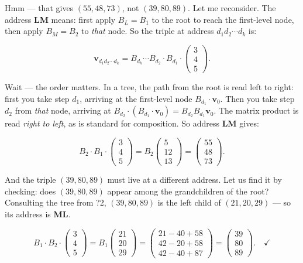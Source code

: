 Hmm --- that gives $(55, 48, 73)$, not $(39, 80, 89)$. Let me reconsider. The address \textbf{LM} means: first apply $B_L = B_1$ to the root to reach the first-level node, then apply $B_M = B_2$ to \textit{that} node. So the triple at address $d_1 d_2 \cdots d_k$ is:

\[
\mathbf{v}_{d_1 d_2 \cdots d_k} = B_{d_k} \cdots B_{d_2} \cdot B_{d_1} \cdot \begin{pmatrix} 3 \\ 4 \\ 5 \end{pmatrix}.
\]

Wait --- the order matters. In a tree, the path from the root is read left to right: first you take step $d_1$, arriving at the first-level node $B_{d_1} \cdot \mathbf{v}_0$. Then you take step $d_2$ from \textit{that} node, arriving at $B_{d_2} \cdot (B_{d_1} \cdot \mathbf{v}_0) = B_{d_2} B_{d_1} \mathbf{v}_0$. The matrix product is read \textit{right to left}, as is standard for composition. So address \textbf{LM} gives:

\[
B_2 \cdot B_1 \cdot \begin{pmatrix} 3 \\ 4 \\ 5 \end{pmatrix} = B_2 \begin{pmatrix} 5 \\ 12 \\ 13 \end{pmatrix} = \begin{pmatrix} 55 \\ 48 \\ 73 \end{pmatrix}.
\]

And the triple $(39, 80, 89)$ must live at a different address. Let us find it by checking: does $(39, 80, 89)$ appear among the grandchildren of the root? Consulting the tree from ?2, $(39, 80, 89)$ is the left child of $(21, 20, 29)$ --- so its address is \textbf{ML}.

\[
B_1 \cdot B_2 \cdot \begin{pmatrix} 3 \\ 4 \\ 5 \end{pmatrix} = B_1 \begin{pmatrix} 21 \\ 20 \\ 29 \end{pmatrix} = \begin{pmatrix} 21 - 40 + 58 \\ 42 - 20 + 58 \\ 42 - 40 + 87 \end{pmatrix} = \begin{pmatrix} 39 \\ 80 \\ 89 \end{pmatrix}. \quad \checkmark
\]

